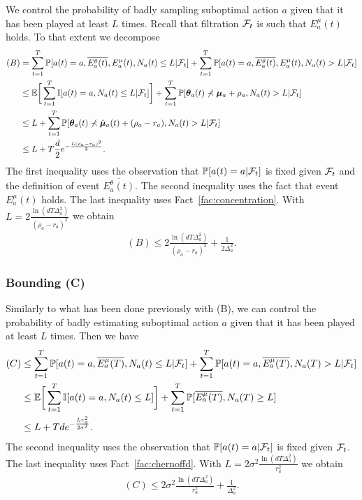 We control the probability of badly sampling suboptimal action $a$ given that it has been played at least $L$ times. Recall that filtration $\mathcal{F}_t$ is such that $E_a^\mu(t)$ holds. To that extent we decompose
\begin{align*}
    (B)
    & = \sum_{t=1}^T \mathbb{P}[a(t) = a, \overline{E_a^\theta(t)}, E_a^\mu(t), N_a(t) \leq L | \mathcal{F}_t]
    + \sum_{t=1}^T \mathbb{P}[a(t) = a, \overline{E_a^\theta(t)}, E_a^\mu(t), N_a(t) > L | \mathcal{F}_t] \\
    & \leq \mathbb{E} \bigg[ \sum_{t=1}^T \mathbb{I}[a(t) = a, N_a(t) \leq L | \mathcal{F}_t] \bigg]
    + \sum_{t=1}^T \mathbb{P}[\boldsymbol{\theta}_a(t) \not\prec \boldsymbol{\mu}_a + \rho_a, N_a(t) > L | \mathcal{F}_t] \\
    & \leq L + \sum_{t=1}^T \mathbb{P}[\boldsymbol{\theta}_a(t) \not\prec \hat {\boldsymbol{\mu}}_a(t) + (\rho_a - r_a), N_a(t) > L | \mathcal{F}_t] \\
    & \leq L + T \frac{d}{2} e^{-\frac{L(\rho_a - r_a)^2}{2}}.
\end{align*}
The first inequality uses the observation that $\mathbb{P}[a(t) = a | \mathcal{F}_t]$ is fixed given $\mathcal{F}_t$ and the definition of event $\overline{E_a^\theta(t)}$. The second inequality uses the fact that event $E_a^\mu(t)$ holds. The last inequality uses Fact~\ref{fac:concentration}.
With $L = 2 \frac{\ln(d T \Delta_a^2)}{(\rho_a - r_a)^2}$ we obtain
\begin{align*}
    (B) \leq 2 \frac{\ln(d T \Delta_a^2)}{(\rho_a - r_a)^2} + \frac{1}{2 \Delta_a^2}.
\end{align*}


\subsubsection{Bounding (C)}

Similarly to what has been done previously with (B), we can control the probability of badly estimating suboptimal action $a$ given that it has been played at least $L$ times. Then we have
\begin{align*}
    (C)
    & \leq \sum_{t=1}^{T} \mathbb{P}[a(t) = a, \overline{E_a^\mu(T)}, N_a(t) \leq L | \mathcal{F}_t]
    + \sum_{t=1}^T \mathbb{P}[a(t) = a, \overline{E_a^\mu(T)}, N_a(T) > L | \mathcal{F}_t] \\
    & \leq \mathbb{E} \bigg[ \sum_{t=1}^T \mathbb{I}[a(t) = a, N_a(t) \leq L] \bigg] + \sum_{t=1}^T \mathbb{P}[\overline{E_a^\mu(T)}, N_a(T) \geq L] \\
    & \leq L + T d e^{-\frac{L r_a^2}{2\sigma^2}}.
\end{align*}
The second inequality uses the observation that $\mathbb{P}[a(t) = a | \mathcal{F}_t]$ is fixed given $\mathcal{F}_t$. The last inequality uses Fact~\ref{fac:chernoffd}. With $L = 2 \sigma^2 \frac{\ln(d T \Delta_a^2)}{r_a^2}$ we obtain
\begin{align*}
    (C) \leq 2 \sigma^2 \frac{\ln(d T \Delta_a^2)}{r_a^2} + \frac{1}{\Delta_a^2}.
\end{align*}



